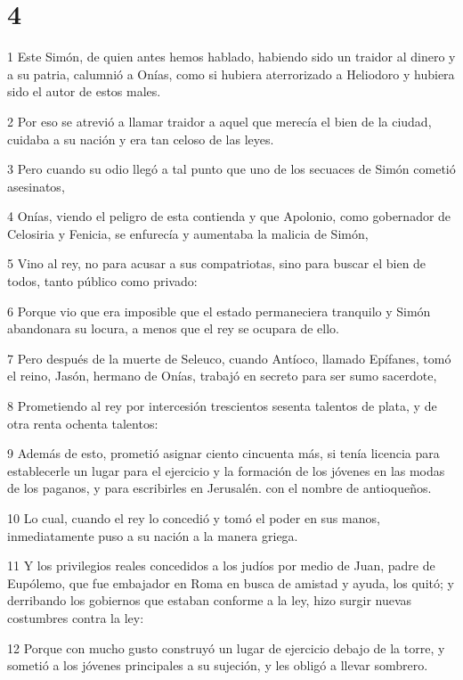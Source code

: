 \chapter{4}

\par 1 Este Simón, de quien antes hemos hablado, habiendo sido un traidor al dinero y a su patria, calumnió a Onías, como si hubiera aterrorizado a Heliodoro y hubiera sido el autor de estos males.
\par 2 Por eso se atrevió a llamar traidor a aquel que merecía el bien de la ciudad, cuidaba a su nación y era tan celoso de las leyes.
\par 3 Pero cuando su odio llegó a tal punto que uno de los secuaces de Simón cometió asesinatos,
\par 4 Onías, viendo el peligro de esta contienda y que Apolonio, como gobernador de Celosiria y Fenicia, se enfurecía y aumentaba la malicia de Simón,
\par 5 Vino al rey, no para acusar a sus compatriotas, sino para buscar el bien de todos, tanto público como privado:
\par 6 Porque vio que era imposible que el estado permaneciera tranquilo y Simón abandonara su locura, a menos que el rey se ocupara de ello.
\par 7 Pero después de la muerte de Seleuco, cuando Antíoco, llamado Epífanes, tomó el reino, Jasón, hermano de Onías, trabajó en secreto para ser sumo sacerdote,
\par 8 Prometiendo al rey por intercesión trescientos sesenta talentos de plata, y de otra renta ochenta talentos:
\par 9 Además de esto, prometió asignar ciento cincuenta más, si tenía licencia para establecerle un lugar para el ejercicio y la formación de los jóvenes en las modas de los paganos, y para escribirles en Jerusalén. con el nombre de antioqueños.
\par 10 Lo cual, cuando el rey lo concedió y tomó el poder en sus manos, inmediatamente puso a su nación a la manera griega.
\par 11 Y los privilegios reales concedidos a los judíos por medio de Juan, padre de Eupólemo, que fue embajador en Roma en busca de amistad y ayuda, los quitó; y derribando los gobiernos que estaban conforme a la ley, hizo surgir nuevas costumbres contra la ley:
\par 12 Porque con mucho gusto construyó un lugar de ejercicio debajo de la torre, y sometió a los jóvenes principales a su sujeción, y les obligó a llevar sombrero.
